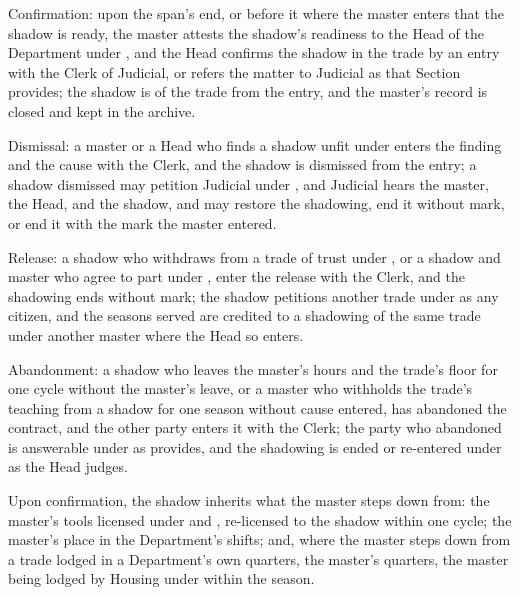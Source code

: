 \begin{clauses}
\item Confirmation: upon the span's end, or before it where the master enters that the shadow is ready, the master attests the shadow's readiness to the Head of the Department under , and the Head confirms the shadow in the trade by an entry with the Clerk of Judicial, or refers the matter to Judicial as that Section provides; the shadow is of the trade from the entry, and the master's record is closed and kept in the archive.
\item Dismissal: a master or a Head who finds a shadow unfit under  enters the finding and the cause with the Clerk, and the shadow is dismissed from the entry; a shadow dismissed may petition Judicial under , and Judicial hears the master, the Head, and the shadow, and may restore the shadowing, end it without mark, or end it with the mark the master entered.
\item Release: a shadow who withdraws from a trade of trust under , or a shadow and master who agree to part under , enter the release with the Clerk, and the shadowing ends without mark; the shadow petitions another trade under  as any citizen, and the seasons served are credited to a shadowing of the same trade under another master where the Head so enters.
\item Abandonment: a shadow who leaves the master's hours and the trade's floor for one cycle without the master's leave, or a master who withholds the trade's teaching from a shadow for one season without cause entered, has abandoned the contract, and the other party enters it with the Clerk; the party who abandoned is answerable under  as  provides, and the shadowing is ended or re-entered under  as the Head judges.
\item Upon confirmation, the shadow inherits what the master steps down from: the master's tools licensed under  and , re-licensed to the shadow within one cycle; the master's place in the Department's shifts; and, where the master steps down from a trade lodged in a Department's own quarters, the master's quarters, the master being lodged by Housing under  within the season.
\end{clauses}

